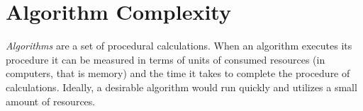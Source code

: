 \section{Algorithm Complexity}
\textit{Algorithms} are a set of procedural calculations.  When an algorithm executes its procedure it can be measured in terms of units of consumed resources (in computers, that is memory) and the time it takes to complete the procedure of calculations.  Ideally, a desirable algorithm would run quickly and utilizes a small amount of resources.


